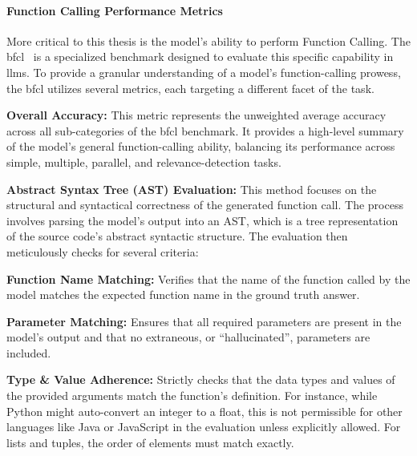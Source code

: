 \paragraph{Function Calling Performance Metrics}

More critical to this thesis is the model's ability to perform Function Calling. The \ac{bfcl}~\cite{BFCL} is a specialized benchmark designed to evaluate this specific capability in \acp{llm}. To provide a granular understanding of a model's function-calling prowess, the \ac{bfcl} utilizes several metrics, each targeting a different facet of the task.

\begin{compactitem}[\textbullet]
    \item \textbf{Overall Accuracy:} This metric represents the unweighted average accuracy across all sub-categories of the \ac{bfcl} benchmark. It provides a high-level summary of the model's general function-calling ability, balancing its performance across simple, multiple, parallel, and relevance-detection tasks.

    \item \textbf{Abstract Syntax Tree (AST) Evaluation:} This method focuses on the structural and syntactical correctness of the generated function call. The process involves parsing the model's output into an AST, which is a tree representation of the source code's abstract syntactic structure. The evaluation then meticulously checks for several criteria:
    \begin{compactitem}[$\circ$]
        \item \textbf{Function Name Matching:} Verifies that the name of the function called by the model matches the expected function name in the ground truth answer.
        \item \textbf{Parameter Matching:} Ensures that all required parameters are present in the model's output and that no extraneous, or ``hallucinated'', parameters are included.
        \item \textbf{Type \& Value Adherence:} Strictly checks that the data types and values of the provided arguments match the function's definition. For instance, while Python might auto-convert an integer to a float, this is not permissible for other languages like Java or JavaScript in the evaluation unless explicitly allowed. For lists and tuples, the order of elements must match exactly.
    \end{compactitem}


\end{compactitem}
